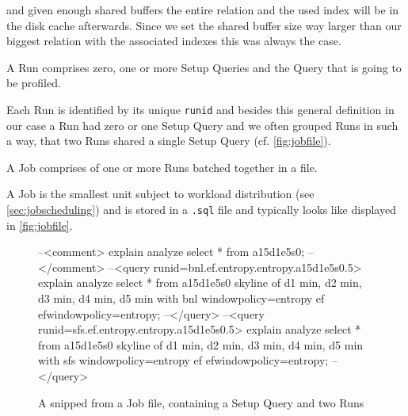\noindent
and given enough shared buffers the entire relation and the used index
will be in the disk cache afterwards. Since we set the shared buffer size
way larger than our biggest relation with the associated indexes this
was always the case.

\begin{definition}[Run]
A Run comprises zero, one or more Setup Queries and the Query that is
going to be profiled.
\end{definition}

\noindent
Each Run is identified by its unique \texttt{runid} and besides this
general definition in our case a Run had zero or one Setup Query and
we often grouped Runs in such a way, that two Runs shared a single
Setup Query (cf. \autoref{fig:jobfile}).

\begin{definition}[Job]
A Job comprises of one or more Runs batched together in a file.
\end{definition}

\noindent
A Job is the smallest unit subject to workload distribution (see
\autoref{sec:jobscheduling}) and is stored in a \texttt{.sql} file
and typically looks like displayed in \autoref{fig:jobfile}.

\begin{figure}[htbp]
\begin{interactive}
--<comment>
explain analyze select * from a15d1e5s0;
--</comment>
--<query runid=bnl.ef.entropy.entropy.a15d1e5s0.5>
explain analyze select * from a15d1e5s0 \prebreak
  \postbreak skyline of d1 min, d2 min, d3 min, d4 min, d5 min \prebreak
  \postbreak with bnl windowpolicy=entropy ef efwindowpolicy=entropy;
--</query>
--<query runid=sfs.ef.entropy.entropy.a15d1e5s0.5>
explain analyze select * from a15d1e5s0 \prebreak
  \postbreak skyline of d1 min, d2 min, d3 min, d4 min, d5 min \prebreak
  \postbreak with sfs windowpolicy=entropy ef efwindowpolicy=entropy;
--</query>
\end{interactive}
\caption{A snipped from a Job file, containing a Setup Query and two Runs}
\label{fig:jobfile}
\end{figure}



